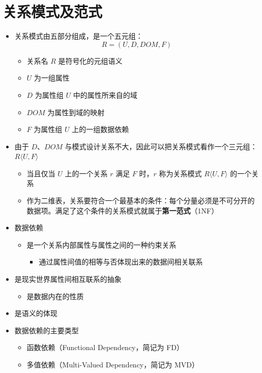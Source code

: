 \section{关系模式及范式}
\begin{itemize}
    \item 关系模式由五部分组成，是一个五元组：$$R=(U,D,DOM,F)$$
    \begin{itemize}
        \item 关系名 $R$ 是符号化的元组语义
        \item $U$ 为一组属性
        \item $D$ 为属性组 $U$ 中的属性所来自的域
        \item $DOM$ 为属性到域的映射
        \item $F$ 为属性组 $U$ 上的一组数据依赖
    \end{itemize}
    \item 由于 $D$、$DOM$ 与模式设计关系不大，因此可以把关系模式看作一个三元组：$R\langle U,F\rangle$
    \begin{itemize}
        \item 当且仅当 $U$ 上的一个关系 $r$ 满足 $F$ 时，$r$ 称为关系模式 $R\langle U,F\rangle$ 的一个关系
        \item 作为二维表，关系要符合一个最基本的条件：每个分量必须是不可分开的数据项。满足了这个条件的关系模式就属于\textbf{第一范式}（1NF）
    \end{itemize}
    \item 数据依赖
    \begin{itemize}
        \item 是一个关系内部属性与属性之间的一种约束关系
        \begin{itemize}
            \item 通过属性间值的相等与否体现出来的数据间相关联系
        \end{itemize}
    \end{itemize}
    \item 是现实世界属性间相互联系的抽象
    \begin{itemize}
        \item 是数据内在的性质
    \end{itemize}
    \item 是语义的体现
    \item 数据依赖的主要类型
    \begin{itemize}
        \item 函数依赖（Functional Dependency，简记为 FD）
        \item 多值依赖（Multi-Valued Dependency，简记为 MVD）

\end{itemize}
\end{itemize}
